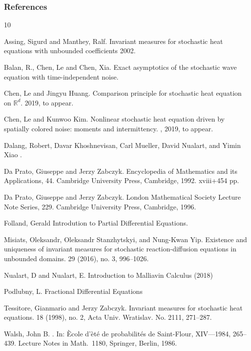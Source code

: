 \documentclass[11pt]{beamer}
\numberwithin{equation}{section}
\newcommand{\R}{\mathbb{R}}
\begin{document}
\begin{frame}[allowframebreaks]
	\frametitle<presentation>{References}
	\begin{thebibliography}{10}

	Assing, Sigurd and Manthey, Ralf.
	\newblock Invariant measures for stochastic heat equations with unbounded coefficients
	  2002.

	Balan, R., Chen, Le and Chen, Xia.
	\newblock Exact asymptotics of the stochastic wave equation with time-independent noise.

	Chen, Le and Jingyu Huang.
	\newblock Comparison principle for stochastic heat equation on $\R^d$.
	  2019, to appear.

	Chen, Le and Kunwoo Kim.
	\newblock Nonlinear stochastic heat equation driven by spatially colored noise: moments and intermittency.
	, 2019, to appear.

	 Dalang, Robert, Davar Khoshnevisan, Carl
	Mueller, David Nualart, and Yimin Xiao
	.

	Da Prato, Giuseppe and Jerzy Zabczyk.
	Encyclopedia of Mathematics and its Applications, 44. Cambridge University Press, Cambridge, 1992. xviii+454 pp.


	Da Prato, Giuseppe and Jerzy Zabczyk.
	\newblock London Mathematical Society Lecture Note Series, 229. Cambridge University Press, Cambridge, 1996.

	Folland, Gerald
	\newblock Introdution to Partial Differential Equations.

	Misiats, Oleksandr, Oleksandr Stanzhytskyi, and Nung-Kwan Yip.
	\newblock Existence and uniqueness of invariant measures for stochastic reaction-diffusion equations in unbounded domains.
	 29 (2016), no. 3, 996--1026.

	Nualart, D and Nualart, E.
	\newblock Introduction to Malliavin Calculus
	 (2018)

	Podlubny, L.
	\newblock Fractional Differential Equations


	Tessitore, Gianmario and Jerzy Zabczyk.
	\newblock Invariant measures for stochastic heat equations.
	 18 (1998), no. 2, Acta Univ. Wratislav. No. 2111, 271--287.

	 Walsh, John B.
	.
	\newblock In: \`Ecole d'\`et\'e de probabilit\'es de
	Saint-Flour, XIV---1984, 265--439.
	Lecture Notes in Math.\ 1180, Springer, Berlin, 1986.
	\end{thebibliography}
\end{frame}
\end{document}
